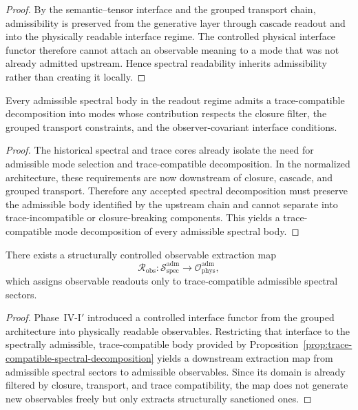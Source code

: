 \begin{proof}
By the semantic--tensor interface and the grouped transport chain, admissibility is preserved from the generative layer through cascade readout and into the physically readable interface regime. The controlled physical interface functor therefore cannot attach an observable meaning to a mode that was not already admitted upstream. Hence spectral readability inherits admissibility rather than creating it locally.
\end{proof}

\begin{proposition}
\label{prop:trace-compatible-spectral-decomposition}
Every admissible spectral body in the readout regime admits a trace-compatible decomposition into modes whose contribution respects the closure filter, the grouped transport constraints, and the observer-covariant interface conditions.
\end{proposition}

\begin{proof}
The historical spectral and trace cores already isolate the need for admissible mode selection and trace-compatible decomposition. In the normalized architecture, these requirements are now downstream of closure, cascade, and grouped transport. Therefore any accepted spectral decomposition must preserve the admissible body identified by the upstream chain and cannot separate into trace-incompatible or closure-breaking components. This yields a trace-compatible mode decomposition of every admissible spectral body.
\end{proof}

\begin{proposition}
\label{prop:observable-extraction-map}
There exists a structurally controlled observable extraction map
\[
\mathcal R_{\mathrm{obs}}: \mathcal S_{\mathrm{spec}}^{\mathrm{adm}} \longrightarrow \mathcal O_{\mathrm{phys}}^{\mathrm{adm}},
\]
which assigns observable readouts only to trace-compatible admissible spectral sectors.
\end{proposition}

\begin{proof}
Phase~IV-I$'$ introduced a controlled interface functor from the grouped architecture into physically readable observables. Restricting that interface to the spectrally admissible, trace-compatible body provided by Proposition~\ref{prop:trace-compatible-spectral-decomposition} yields a downstream extraction map from admissible spectral sectors to admissible observables. Since its domain is already filtered by closure, transport, and trace compatibility, the map does not generate new observables freely but only extracts structurally sanctioned ones.
\end{proof}


